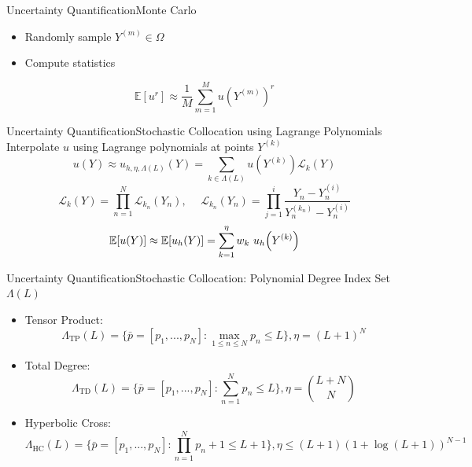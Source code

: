 \documentclass{beamer}
\newcommand{\expv}[1]{\ensuremath{\mathbb{E}[ #1]}}
\begin{document}
\begin{frame}{Uncertainty Quantification}{Monte Carlo}\vspace{-50pt}
\begin{itemize}
\item Randomly sample $Y^{(m)}\in\Omega$
\item Compute statistics
\end{itemize}
\[\expv{u^r}\approx\frac{1}{M}\sum_{m=1}^M u\left(Y^{(m)}\right)^r\]
\end{frame}

\begin{frame}{Uncertainty Quantification}{Stochastic Collocation using Lagrange Polynomials}\vspace{-20pt}
Interpolate $u$ using Lagrange polynomials at points $Y^{(k)}$
\small
\begin{equation*}\label{approx}
u(Y)\approx u_{h,\eta,\Lambda(L)}(Y)=\sum_{k\in\Lambda(L)} u(Y^{(k)})\mathcal{L}_k(Y)
\end{equation*}
\begin{equation*}
\mathcal{L}_k(Y)=\prod_{n=1}^N \mathcal{L}_{k_n}(Y_n),\hspace{15pt}\mathcal{L}_{k_n}(Y_n)=\prod_{j=1}^i \frac{Y_n-Y_n^{(i)}}{Y_n^{(k_n)}-Y_n^{(i)}}
\end{equation*}
\begin{equation*}
\expv{u(Y)}\approx\expv{u_h(Y)}=\sum_{k=1}^\eta w_k ~u_h\qty(Y^{(k)})
\end{equation*}
\end{frame}

\begin{frame}{Uncertainty Quantification}{Stochastic Collocation: Polynomial Degree Index Set $\Lambda(L)$}\vspace{-20pt}
\begin{itemize}
\item Tensor Product:\scriptsize\[\Lambda_\text{TP}(L)=\Big\{\bar p=[p_1,...,p_N]: \max_{1\leq n\leq N}p_n\leq L \Big\},\eta=(L+1)^N\]\normalsize
\item Total Degree: \scriptsize\[\Lambda_\text{TD}(L)=\Big\{\bar p=[p_1,...,p_N]:\sum_{n=1}^N p_n \leq L \Big\},\eta={L+N\choose N}\]\normalsize
\item Hyperbolic Cross: \scriptsize\[\Lambda_\text{HC}(L)=\Big\{\bar p=[p_1,...,p_N]:\prod_{n=1}^N p_n+1 \leq L+1 \Big\},\eta\leq (L+1)(1+\log(L+1))^{N-1}\]
\end{itemize}
\end{frame}
\end{document}

